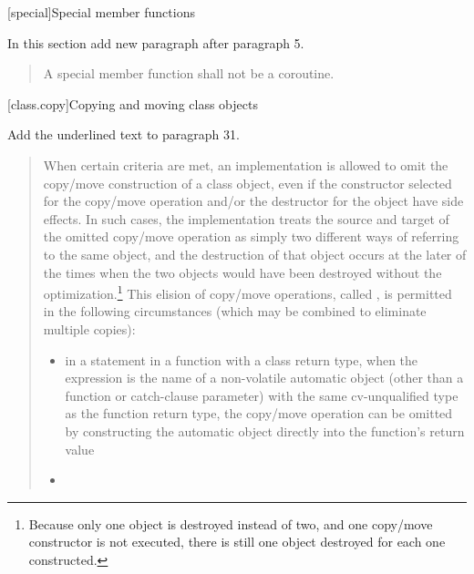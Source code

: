 
\setcounter{chapter}{11}
[special]{Special member functions}

In this section add new paragraph after paragraph 5.

\begin{quote}
	\setcounter{Paras}{5}
	\pnum
	A special member function shall not be a coroutine.
\end{quote}

\setcounter{section}{7}
[class.copy]{Copying and moving class objects}%


Add the underlined text to paragraph 31.

\begin{quote}
\setcounter{Paras}{30}
\pnum
{}%
%
%
%
%
When certain criteria are met, an implementation is
allowed to omit the copy/move construction of a class object,
even if the constructor selected for the copy/move operation and/or the
destructor for the object have
%
side effects.  In such cases, the
implementation treats the source and target of the
omitted copy/move operation as simply two different ways of
referring to the same object, and the destruction of
that object occurs at the later of the times when the
two objects would have been destroyed without the
optimization.\footnote{Because only one object is destroyed instead of two,
  and one copy/move constructor
  is not executed, there is still one object destroyed for each one constructed.}
This elision of copy/move operations, called
%
%
,
is permitted in the
following circumstances (which may be combined to
eliminate multiple copies):

\begin{itemize}
  \item in a  statement in a function with a class return type,
  when the expression is the name of a non-volatile
  automatic object
  (other than a function or catch-clause parameter)
  with the same cv-unqualified type as
  the function return type, the copy/move operation can be
  omitted by constructing the automatic object directly
  into the function's return value
  \item
\end{itemize}
\end{quote}